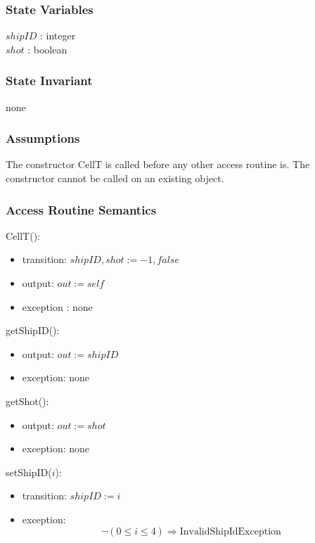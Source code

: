 \documentclass[12pt]{article}
\begin{document}
\subsubsection* {State Variables}

$shipID$ : integer\\
$shot$ : boolean

\subsubsection* {State Invariant}

none

\subsubsection* {Assumptions}
The constructor CellT is called before any other access routine is. The constructor cannot be called on an existing object.

\subsubsection* {Access Routine Semantics}

CellT():
\begin{itemize}
\item transition: $shipID, shot := -1, false $
\item output: $out := \mathit{self}$
\item exception : none
\end{itemize}

\noindent getShipID():
\begin{itemize}
\item output: $out := shipID$
\item exception: none
\end{itemize}

\noindent getShot():
\begin{itemize}
\item output: $out := shot$
\item exception: none
\end{itemize}

\noindent setShipID($i$):
\begin{itemize}
\item transition: $shipID := i$
\item exception: $$\neg (0 \leq i \leq 4) \Rightarrow \mbox{InvalidShipIdException}$$
\end{itemize}
\end{document}
